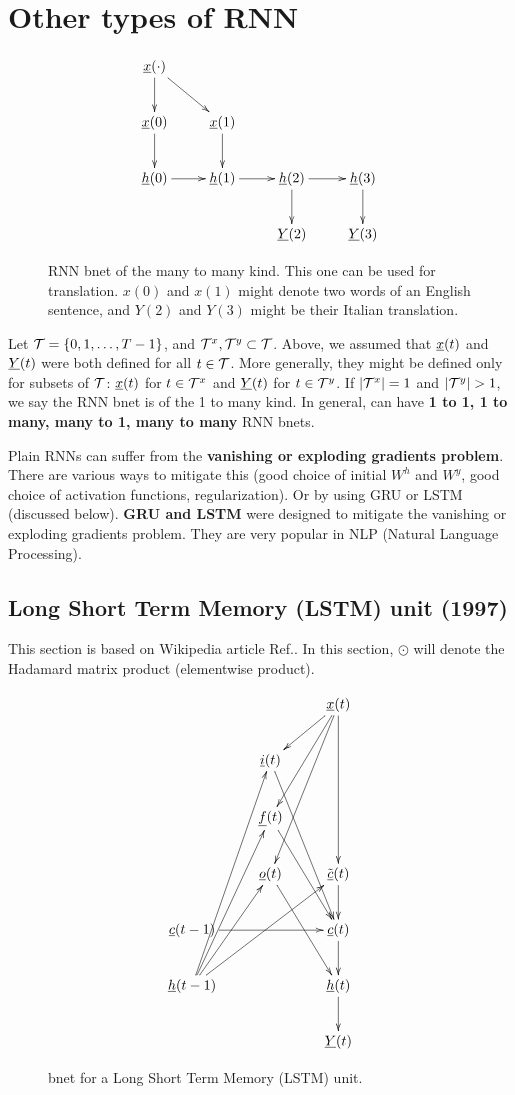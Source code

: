  
\section{Other types of RNN}

\begin{figure}[h!]
\centering
$$\xymatrix{
\rvx(\cdot)\ar[d]\ar[dr]\\
\rvx(0)\ar[d]&
\rvx(1)\ar[d]&
\\
\rvh(0)\ar[r]&
\rvh(1)\ar[r]&
\rvh(2)\ar[d]\ar[r]&
\rvh(3)\ar[d]\\
&
&
\rvY(2)&
\rvY(3)
}$$
\caption{RNN bnet of the
many to many kind. This
one can be used for  translation.
$x(0)$ and $x(1)$ might
denote two words of an English
sentence, and $Y(2)$ 
and $Y(3)$ might be
their Italian translation.}
\label{fig-rnn-translation}
\end{figure}

Let ${\cal T}=\{0,1, \dots , T-1\}$,
and
${\cal T}^x, {\cal T}^y\subset {\cal T}$.
Above, 
we assumed that 
${\underline{x}}(t)$ and ${\underline{Y}}(t)$
were both defined 
for all $t\in {\cal T}$.
More generally, they 
might be defined only
for subsets of ${\cal T}$:
${\underline{x}}(t)$ for $t\in {\cal T}^x$
and 
${\underline{Y}}(t)$ for $t\in {\cal T}^y$.
If $|{\cal T}^x|=1$ and
$|\calt^y|>1$, 
we say the RNN bnet is of
the 1 to many kind.
In general, can have 
{\bf 1 to 1, 1 to many, many to 1, 
many to many} RNN bnets.

Plain RNNs can suffer 
from the
{\bf vanishing or exploding
 gradients problem}.
There are various ways to
mitigate this (good choice of initial
$W^h$ and $W^y$, 
good choice of activation 
functions, regularization).
Or by using GRU or LSTM (discussed below).
 {\bf GRU and LSTM}
were designed to mitigate the
vanishing or exploding gradients problem.
They are very popular in NLP (Natural
Language Processing).



\newpage

\subsection{Long  
Short Term Memory (LSTM) unit (1997)}

This section
is based on Wikipedia article 
Ref.\cite{lstm}. In this section,
$\odot$
will denote the Hadamard matrix product
(elementwise product).

\begin{figure}[h!]
\centering
$$\xymatrix{
&&\rvx(t)\ar[ddd]\ar[dl]\ar[ldd]\ar[lddd]
\\
&\rvi(t)\ar[rddd]
&\\
&\rvf(t)\ar[rdd]&\\
&\rvo(t)\ar[ddr]
&\tilde{\rvc}(t)\ar[d]
\\
\rvc(t-1)\ar[rr]
&&\rvc(t)\ar[d]
\\
\rvh(t-1)\ar[ruuuu]\ar[ruuu]\ar[ruu]\ar[rruu]
&&\rvh(t)\ar[d]\\
&&\rvY(t)
}$$
\caption{
bnet for a Long Short Term Memory
 (LSTM) unit.}
\label{fig-rnn-lstm}
\end{figure}

